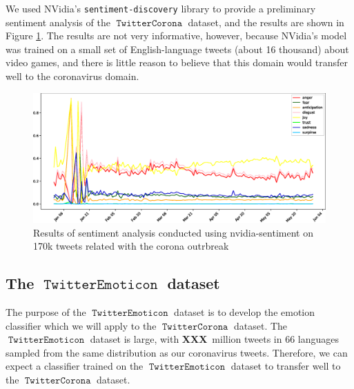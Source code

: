 \documentclass[11pt]{article}
\newcommand{\XXX}{\textbf{XXX}~}
\DeclareMathOperator{\emoticon}{\texttt{TwitterEmoticon}}
\DeclareMathOperator{\corona}{\texttt{TwitterCorona}}
\begin{document}
We used NVidia's \texttt{sentiment-discovery} library to provide a preliminary sentiment analysis of the $\corona$ dataset,
and the results are shown in Figure \ref{fig:nvidia-sentiment}.
The results are not very informative, however, because NVidia's model was trained on a small set of English-language tweets (about 16 thousand) about video games,
and there is little reason to believe that this domain would transfer well to the coronavirus domain.

\begin{figure}
    \includegraphics[width=\textwidth]{images/emotions.eps}
    \caption{Results of sentiment analysis conducted using nvidia-sentiment on 170k tweets related with the corona outrbreak }
    \label{fig:nvidia-sentiment}
\end{figure}

\subsection {The $\emoticon$ dataset}

The purpose of the $\emoticon$ dataset is to develop the emotion classifier which we will apply to the $\corona$ dataset.
The $\emoticon$ dataset is large, with \XXX million tweets in 66 languages sampled from the same distribution as our coronavirus tweets.
Therefore, we can expect a classifier trained on the $\emoticon$ dataset to transfer well to the $\corona$ dataset.
\end{document}
